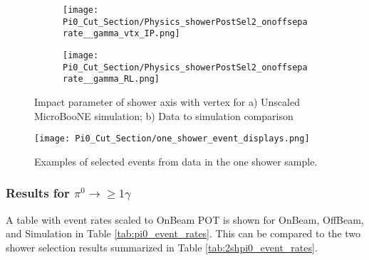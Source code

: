 \begin{figure}[H]
  \begin{subfigure}[t]{0.35\textwidth}
\texttt{[image: Pi0\_Cut\_Section/Physics\_showerPostSel2\_onoffseparate\_\_gamma\_vtx\_IP.png]}
  \caption{ }
  \end{subfigure} 
  \hspace{20mm}
  \begin{subfigure}[t]{0.35\textwidth}
\texttt{[image: Pi0\_Cut\_Section/Physics\_showerPostSel2\_onoffseparate\_\_gamma\_RL.png]}
  \caption{ }
  \end{subfigure} 
\caption{ Impact parameter of shower axis with vertex for a) Unscaled MicroBooNE simulation; b) Data to simulation comparison }
\label{fig:cutjust_pi0_1shower_IP}
\end{figure}


\begin{figure}[H]
    \centering
\texttt{[image: Pi0\_Cut\_Section/one\_shower\_event\_displays.png]}
\caption{ Examples of selected events from data in the one shower sample.}
\label{fig:one_shower_event_displays}
\end{figure}



\subsubsection{Results for $\pi^0\rightarrow \geq 1\gamma$}
\par A table with event rates scaled to OnBeam POT is shown for OnBeam, OffBeam, and Simulation in Table \ref{tab:pi0_event_rates}. This can be compared to the two shower selection results summarized in Table \ref{tab:2shpi0_event_rates}.  

